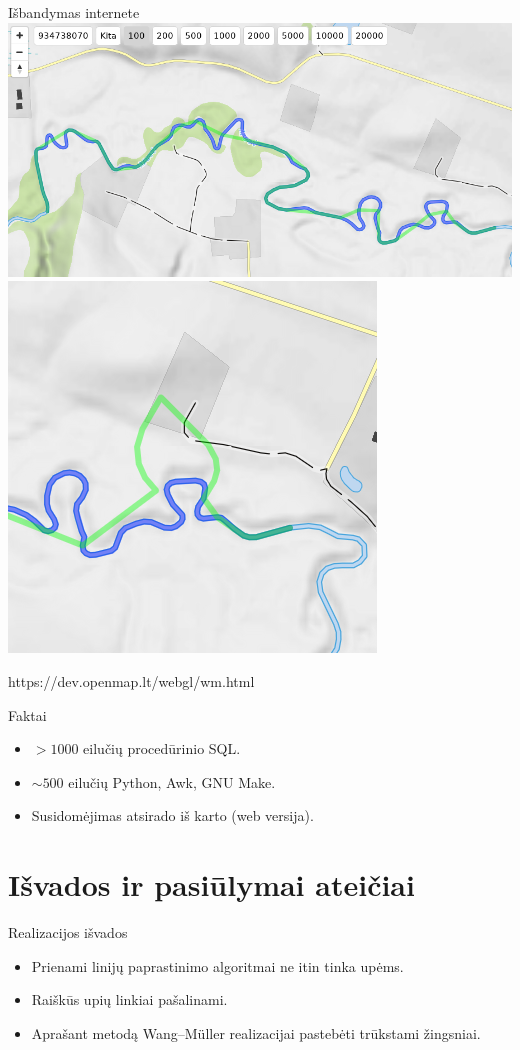 \documentclass[14pt]{beamer}
\newcommand{\WM}{Wang--M{\"u}ller}
\begin{document}
\begin{frame}{Išbandymas internete}
  \centering
  \includegraphics[width=.75\textwidth]{openmap-wm-good.png}
  \includegraphics[width=.3\textwidth]{openmap-wm-bad.png}

  {\tiny https://dev.openmap.lt/webgl/wm.html}
\end{frame}

\begin{frame}{Faktai}
  \begin{itemize}
    \item $>1000$ eilučių procedūrinio SQL.
    \item $\sim500$ eilučių Python, Awk, GNU Make.
    \item Susidomėjimas atsirado iš karto (web versija).
  \end{itemize}
\end{frame}

\section{Išvados ir pasiūlymai ateičiai}

\begin{frame}{Realizacijos išvados}
  \begin{itemize}[<+->]

    \item Prienami linijų paprastinimo algoritmai ne itin tinka upėms.

    \item Raiškūs upių linkiai pašalinami.

    \item Aprašant metodą {\WM} realizacijai pastebėti trūkstami žingsniai.

  \end{itemize}
\end{frame}
\end{document}
